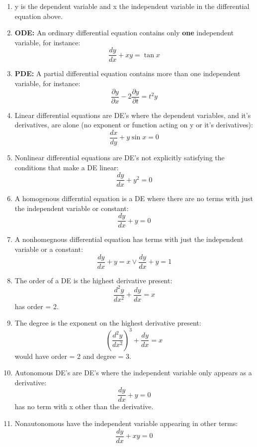 \documentclass[12pt]{article}
\begin{document}
\begin{enumerate}
    \item 
    y is the dependent variable and x the independent variable in the differential 
    equation above.

    \item
    \textbf{ODE:} An ordinary differential equation 
    contains only \textbf{one} independent variable, 
    for instance: \[\frac{dy}{dx} + xy = \tan x\]

    \item 
    \textbf{PDE:}
    A partial differential equation contains more than one independent variable, 
    for instance: 
    \[\frac{\partial y}{\partial x} - 2\frac{\partial y}{\partial t} = t^2 y\]

    \item 
    Linear differential equations are DE's where the dependent variables, and it's 
    derivatives, are alone (no exponent or function acting on y or it's derivatives): 
    \[\frac{dx}{dy} + y\sin x = 0\]

    \item Nonlinear differential equations are DE's not explicitly satisfying 
    the conditions that make a DE linear: 
    \[\frac{dy}{dx}+y^2 = 0\]

    \item 
    A homogenous differntial equation is a DE where there are no terms with just the 
    independent variable or constant: 
    \[ 
        \frac{dy}{dx} + y = 0
    \]

    \item 
    A nonhomegnous differential equation has terms with just the independent variable 
    or a constant: 
    \[ \frac{dy}{dx} + y = x \lor \frac{dy}{dx} + y = 1 \]

\item 
    The order of a DE is the highest derivative present: 
    \[\frac{d^2y}{dx^2} + \frac{dy}{dx} = x\]
    has order = 2. 

\item 
    The degree is the exponent on the highest derivative present: 
    \[\left(\frac{d^2y}{dx^2} \right)^3 + \frac{dy}{dx} = x\]
    would have order = 2 and degree = 3.

\item 
    Autonomous DE's are DE's where the independent variable only appears as a derivative:
    \[\frac{dy}{dx} + y = 0\]
    has no term with x other than the derivative. 

\item 
    Nonautonomous have the independent variable appearing in other terms: 
    \[\frac{dy}{dx} + xy = 0\]
\end{enumerate}
\end{document}
